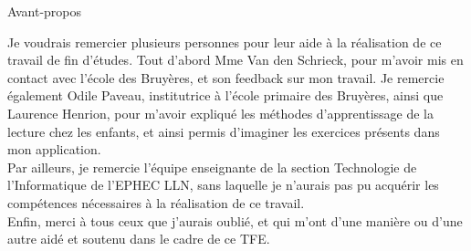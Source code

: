 \begin{center}
\begin{minipage}{0.8\textwidth}
\begin{center}
\large Avant-propos
\end{center}
Je voudrais remercier plusieurs personnes pour leur aide à la réalisation de ce travail de fin d'études. Tout d'abord Mme Van den Schrieck, pour m'avoir mis en contact avec l'école des Bruyères, et son feedback sur mon travail. Je remercie également Odile Paveau, institutrice à l'école primaire des Bruyères, ainsi que Laurence Henrion, pour m'avoir expliqué les méthodes d'apprentissage de la lecture chez les enfants, et ainsi permis d'imaginer les exercices présents dans mon application.\\

Par ailleurs, je remercie l'équipe enseignante de la section Technologie de l'Informatique de l'EPHEC LLN, sans laquelle je n'aurais pas pu acquérir les compétences nécessaires à la réalisation de ce travail.\\

Enfin, merci à tous ceux que j'aurais oublié, et qui m'ont d'une manière ou d'une autre aidé et soutenu dans le cadre de ce TFE.
\end{minipage}
\end{center}
